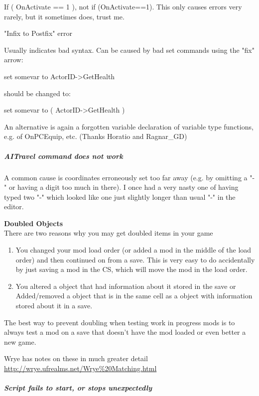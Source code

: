 \documentclass[
]{article}
\begin{document}
If ( OnActivate == 1 ), not if (OnActivate==1). This only causes errors
very rarely, but it sometimes does, trust me.

"Infix to Postfix" error

Usually indicates bad syntax. Can be caused by bad set commands using
the "fix" arrow:

set somevar to ActorID-\textgreater GetHealth

should be changed to:

set somevar to ( ActorID-\textgreater GetHealth )

An alternative is again a forgotten variable declaration of variable
type functions, e.g. of OnPCEquip, etc. (Thanks Horatio and Ragnar\_GD)

\hypertarget{aitravel-command-does-not-work}{%
\subparagraph{AITravel command does not
work}\label{aitravel-command-does-not-work}}

A common cause is coordinates erroneously set too far away (e.g. by
omitting a "-" or having a digit too much in there). I once had a very
nasty one of having typed two "-" which looked like one just slightly
longer than usual "-" in the editor.

\textbf{Doubled Objects\\
}There are two reasons why you may get doubled items in your game

\begin{enumerate}
\def\labelenumi{\arabic{enumi}.}
\item
  You changed your mod load order (or added a mod in the middle of the
  load order) and then continued on from a save. This is very easy to do
  accidentally by just saving a mod in the CS, which will move the mod
  in the load order.
\item
  You altered a object that had information about it stored in the save
  or Added/removed a object that is in the same cell as a object with
  information stored about it in a save.
\end{enumerate}

The best way to prevent doubling when testing work in progress mods is
to always test a mod on a save that doesn't have the mod loaded or even
better a new game.

Wrye has notes on these in much greater detail
\url{http://wrye.ufrealms.net/Wrye\%20Matching.html}

\hypertarget{script-fails-to-start-or-stops-unexpectedly}{%
\subparagraph{Script fails to start, or stops
unexpectedly}\label{script-fails-to-start-or-stops-unexpectedly}}
\end{document}
